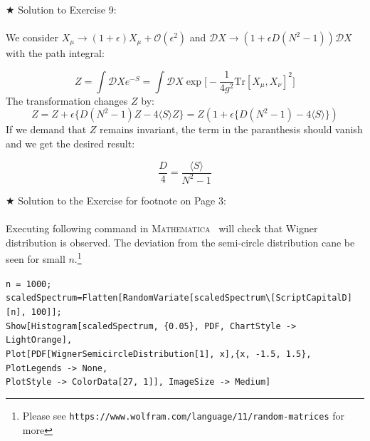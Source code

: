 \documentclass[11pt]{article}
\newcommand{\MA}{\textsc{Mathematica}}
\begin{document}
\noindent $\bigstar$ Solution to Exercise 9: 
\\ \\ 
We consider $ X_{\mu} \to (1 + \epsilon) X_{\mu} + \mathcal{O}(\epsilon^2)$
and $\mathcal{D}X \to (1 + \epsilon D (N^2-1))\mathcal{D}X$ with the path integral:

\begin{equation}
	Z = \int \mathcal{D}X e^{-S} = \int \mathcal{D}X \exp\Big[-\frac{1}{4g^2} \mbox{Tr} [X_\mu,X_\nu]^2\Big]
\end{equation}
The transformation changes $Z$ by:
\begin{equation}
	Z = Z + \epsilon \Big\{ D(N^2 -1)Z - 4\langle S \rangle Z  \Big\} = Z ( 1 + \epsilon \Big\{ D(N^2 -1) - 4\langle S \rangle   \Big\})
\end{equation}
If we demand that $Z$ remains invariant, the term in the paranthesis should vanish and we get the desired result:

\begin{equation}
	\frac{D}{4} = \frac{\langle S \rangle}{N^2 - 1 }
\end{equation}  
           
\noindent $\bigstar$ Solution to the Exercise for footnote on Page 3:
\\  \\
Executing following command in \MA~ will check that Wigner distribution is 
observed. The deviation from the semi-circle distribution cane be seen for small 
$n$.\footnote{Please see \texttt{https://www.wolfram.com/language/11/random-matrices} for more}
\vspace{3mm} 
\begin{mdframed}[backgroundcolor=magenta!3]
	\begin{footnotesize} 
		\verb"n = 1000;"\\ 
		\verb"scaledSpectrum=Flatten[RandomVariate[scaledSpectrum\[ScriptCapitalD][n], 100]];"\\
		\verb"Show[Histogram[scaledSpectrum, {0.05}, PDF, ChartStyle -> LightOrange], "  \\ 
		\verb"Plot[PDF[WignerSemicircleDistribution[1], x],{x, -1.5, 1.5}, PlotLegends -> None, " \\
		\verb"PlotStyle -> ColorData[27, 1]], ImageSize -> Medium]"
	\end{footnotesize} 
\end{mdframed} 



\end{document}
